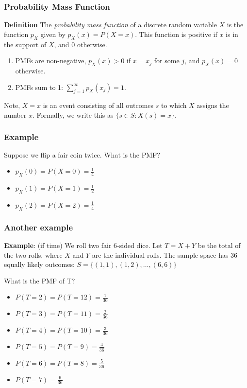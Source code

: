 \documentclass{beamer}
\begin{document}
\begin{frame}
\frametitle{Probability Mass Function}

\textbf{Definition} The \emph{probability mass function} of a discrete random variable $X$ is the function $p_X$ given by $p_X(x) = P(X = x)$. This function is positive if $x$ is in the support of $X$,  and $0$ otherwise. 

\bigskip 

\begin{enumerate}
\item 
PMFs are non-negative, $p_X(x) > 0$ if  $x = x_j$ for some $j$, and $p_X(x) = 0$ otherwise. 
\item
PMFs sum to 1: $\sum_{j=1}^{\infty} p_X(x_j) = 1$.
\end{enumerate}

\bigskip

Note, $X = x$ is an event consisting of all outcomes $s$ to which $X$ assigns the number $x$. Formally, we write this as $\{s \in S : X(s) = x\}$.

\end{frame}

\begin{frame}
\frametitle{Example}

Suppose we flip a fair coin twice. What is the PMF? 

\bigskip

\begin{itemize}
	\item $p_X(0) = P(X = 0) = \frac{1}{4}$ 
	\item $p_X(1) = P(X = 1) = \frac{1}{2}$ 
	\item $p_X(2) = P(X = 2) = \frac{1}{4}$ 
\end{itemize}

\end{frame}



\begin{frame}
\frametitle{Another example}

\textbf{Example}: (if time) We roll two fair 6-sided dice. Let $T = X + Y$ be the total of the two rolls, where $X$ and $Y$ are the individual rolls. The sample space has 36 equally likely outcomes: $S = \{(1,1), (1,2), \ldots,(6,6)\}$

\bigskip

What is the PMF of T? 
\begin{itemize}
	\item $P(T=2) = P(T=12) = \frac{1}{36}$ 
	\item $P(T=3) = P(T=11) = \frac{2}{36}$
	\item $P(T=4) = P(T=10) = \frac{3}{36}$ 
	\item $P(T=5) = P(T=9) = \frac{4}{36}$ 
	\item $P(T=6) = P(T=8) = \frac{5}{36}$
	\item $P(T=7) = \frac{6}{36}$
\end{itemize}

\end{frame}
\end{document}
